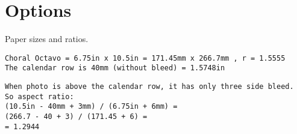 \documentclass[11pt,oneside]{memoir-article}
\begin{document}
\chapter{Options}
\label{sec:orgf63949e}

Paper sizes and ratios.

\begin{verbatim}
Choral Octavo = 6.75in x 10.5in = 171.45mm x 266.7mm , r = 1.5555
The calendar row is 40mm (without bleed) = 1.5748in
\end{verbatim}

\begin{verbatim}
When photo is above the calendar row, it has only three side bleed.
So aspect ratio:
(10.5in - 40mm + 3mm) / (6.75in + 6mm) = 
(266.7 - 40 + 3) / (171.45 + 6) =
= 1.2944
\end{verbatim}
\end{document}
